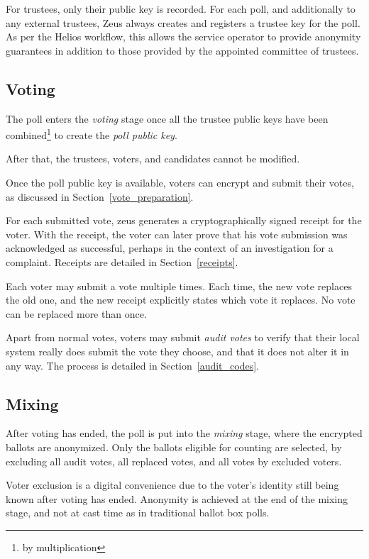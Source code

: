 \documentclass[letterpaper,twocolumn,10pt]{article}
\begin{document}
For trustees, only their public key is recorded.
For each poll, and additionally to any external trustees,
Zeus always creates and registers a trustee key for the poll.
As per the Helios workflow, this allows the service operator to
provide anonymity guarantees in addition to those provided by
the appointed committee of trustees.

\subsection{Voting}
\label{voting}
The poll enters the \emph{voting} stage once all the trustee public
keys have been combined\footnote{by multiplication} to create the
\emph{poll public key}.

After that, the trustees, voters, and candidates cannot be modified.

Once the poll public key is available,
voters can encrypt and submit their votes,
as discussed in Section~\ref{vote_preparation}.

For each submitted vote, zeus generates a cryptographically signed
receipt for the voter.
With the receipt, the voter can later prove that his vote submission was
acknowledged as successful, perhaps in the context of an investigation
for a complaint.
Receipts are detailed in Section~\ref{receipts}.

Each voter may submit a vote multiple times.
Each time, the new vote replaces the old one,
and the new receipt explicitly states which vote it replaces.
No vote can be replaced more than once.

Apart from normal votes, voters may submit \emph{audit votes} to verify
that their local system really does submit the vote they choose,
and that it does not alter it in any way.
The process is detailed in Section~\ref{audit_codes}.

\subsection{Mixing}
\label{mixing}
After voting has ended, the poll is put into the \emph{mixing} stage,
where the encrypted ballots are anonymized.
Only the ballots eligible for counting are selected, by excluding
all audit votes, all replaced votes, and all votes by excluded voters.

Voter exclusion is a digital convenience due to
the voter's identity still being known after voting has ended.
Anonymity is achieved at the end of the mixing stage,
and not at cast time as in traditional ballot box polls.
\end{document}

